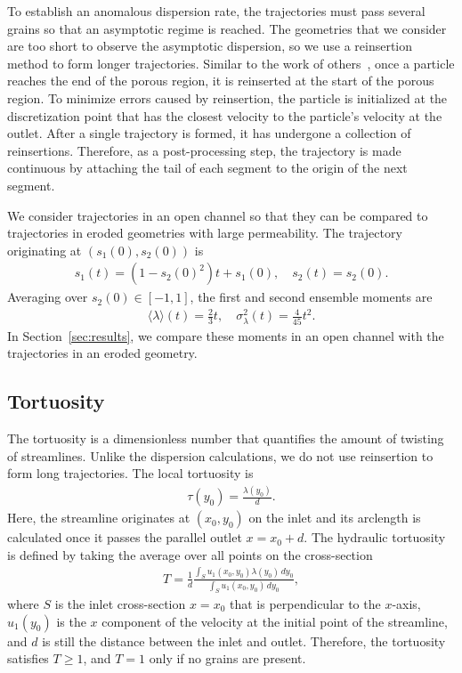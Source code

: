 \documentclass[preprint,10pt]{elsarticle}
\begin{document}
To establish an anomalous dispersion rate, the trajectories must pass
several grains so that an asymptotic regime is reached. The geometries
that we consider are too short to observe the asymptotic dispersion, so
we use a reinsertion method to form longer trajectories. Similar to the
work of others~\cite{dea-qua-bir-jua2018, puy-gou-den2019}, once a
particle reaches the end of the porous region, it is reinserted at the
start of the porous region.  To minimize errors caused by reinsertion,
the particle is initialized at the discretization point that has the
closest velocity to the particle's velocity at the outlet.  After a
single trajectory is formed, it has undergone a collection of
reinsertions.  Therefore, as a post-processing step, the trajectory is
made continuous by attaching the tail of each segment to the origin of
the next segment.  

We consider trajectories in an open channel so that they can be compared
to trajectories in eroded geometries with large permeability.  The
trajectory originating at $(s_1(0),s_2(0))$ is
\begin{align}
  s_1(t) = (1-s_2(0)^2)t + s_1(0), \quad
  s_2(t) = s_2(0).
\end{align}
Averaging over $s_2(0) \in [-1,1]$, the first and second ensemble
moments are
\begin{align}
  \langle \lambda \rangle (t) = \frac{2}{3}t, \quad 
    \sigma_\lambda^2(t) = \frac{4}{45}t^2.
\end{align}
In Section~\ref{sec:results}, we compare these moments in an open
channel with the trajectories in an eroded geometry.

\subsection{Tortuosity}
The tortuosity is a dimensionless number that quantifies the amount of
twisting of streamlines. Unlike the dispersion calculations, we do not
use reinsertion to form long trajectories.  The local tortuosity is
\begin{align}
  \tau(y_0) = \frac{\lambda(y_0)}{d}.
  \label{eqn:localTort}
\end{align}
Here, the streamline originates at $(x_0,y_0)$ on the inlet and its
arclength is calculated once it passes the parallel outlet $x = x_0 +
d$.  The hydraulic tortuosity is defined by taking the average over all
points on the cross-section
\begin{align}
  T = \frac{1}{d}\frac{\displaystyle\int_{S}u_1(x_0,y_0)\lambda(y_0)\,dy_0}
  {\displaystyle\int_{S}u_1(x_0,y_0)\,dy_0},
  \label{eqn:tortuosity1}
\end{align}
where $S$ is the inlet cross-section $x = x_0$ that is perpendicular to
the $x$-axis, $u_1(y_0)$ is the $x$ component of the velocity at the
initial point of the streamline, and $d$ is still the distance between
the inlet and outlet. Therefore, the tortuosity satisfies $T \geq 1$,
and $T=1$ only if no grains are present.  
\end{document}
